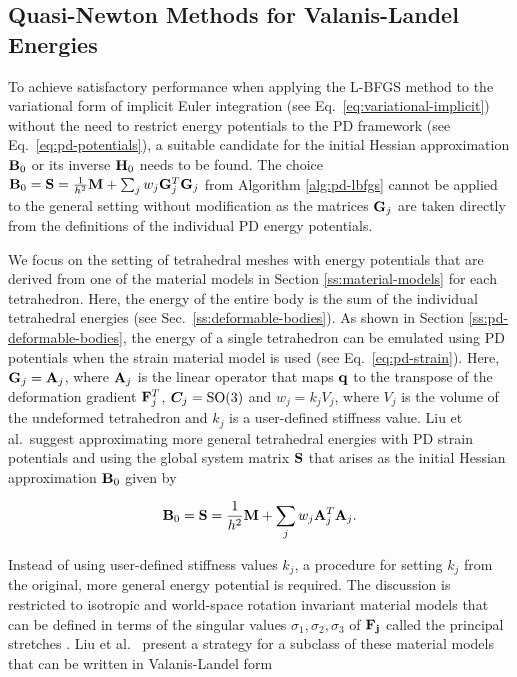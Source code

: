 \subsection{Quasi-Newton Methods for Valanis-Landel Energies}\label{ss:qn-valanis-landel}
To achieve satisfactory performance when applying the L-BFGS method to the variational form of implicit Euler integration 
(see Eq.\ \ref{eq:variational-implicit}) without the need to restrict energy potentials to the PD framework (see Eq.\ \ref{eq:pd-potentials}), a suitable
candidate for the initial Hessian approximation $\mathbf{B}_0$ or its inverse $\mathbf{H}_0$ needs to be found. The choice $\mathbf{B}_0 = 
\mathbf{S} = \frac{1}{h^2}\mathbf{M} + \sum_j w_j \mathbf{G}_j^T \mathbf{G}_j$ from Algorithm \ref{alg:pd-lbfgs} cannot be applied to the general setting 
without modification as the matrices $\mathbf{G}_j$ are taken directly from the definitions of the individual PD energy potentials.


We focus on the setting of tetrahedral meshes with energy potentials that are derived from one of the material models in Section \ref{ss:material-models} 
for each tetrahedron. Here, the energy of the entire body is the sum of the individual tetrahedral energies (see Sec.\ \ref{ss:deformable-bodies}).
As shown in Section \ref{ss:pd-deformable-bodies}, the energy of a single tetrahedron can be emulated using PD potentials when the strain material model is 
used (see Eq.\ \ref{eq:pd-strain}). Here, $\mathbf{G}_j = \mathbf{A}_j$, where $\mathbf{A}_j$ is the linear operator that maps $\mathbf{q}$ 
to the transpose of the deformation gradient $\mathbf{F}^T_j$, $\bm{C}_j = \text{SO}(3)$ and $w_j = k_jV_j$, where $V_j$ is the
volume of the undeformed tetrahedron and $k_j$ is a user-defined stiffness value. 
Liu et al.\ suggest approximating more general tetrahedral energies with PD strain potentials and using the global system
matrix $\mathbf{S}$ that arises as the initial Hessian approximation $\mathbf{B}_0$ given by

\begin{equation}\label{eq:global-matrix-strain}
    \mathbf{B}_0 = \mathbf{S} = \frac{1}{h^2}\mathbf{M} + \sum_j w_j \mathbf{A}_j^T \mathbf{A}_j.
\end{equation}

Instead of using user-defined stiffness values $k_j$, a procedure for setting $k_j$ from the original, more general energy
potential is required. The discussion is restricted to isotropic and world-space rotation invariant material models that 
can be defined in terms of the singular 
values $\sigma_1, \sigma_2, \sigma_3$ of $\mathbf{F_j}$ called the principal stretches \cite{sifakis2012}. Liu et al.\ 
\cite{liu2017} present a strategy for a subclass of these material models that can be written in Valanis-Landel form

